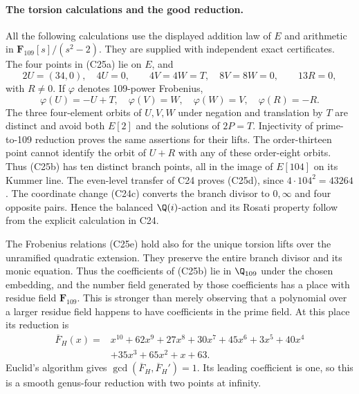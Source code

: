 \paragraph{The torsion calculations and the good reduction.}
All the following calculations use the displayed addition law
of $E$ and arithmetic in $\mathbf F_{109}[s]/(s^2-2)$.
They are supplied with independent exact certificates.
The four points in (C25a) lie on $E$, and
\[
 2U=(34,0),\quad4U=0,\qquad
 4V=4W=T,\quad8V=8W=0,\qquad13R=0,
\]
with $R\ne0$. If $\varphi$ denotes 109-power Frobenius,
\[
 \varphi(U)=-U+T,\quad
 \varphi(V)=W,\quad\varphi(W)=V,\quad
 \varphi(R)=-R.
 \tag{C25e}
\]
The three four-element orbits of $U,V,W$ under negation
and translation by $T$ are distinct and avoid both
$E[2]$ and the solutions of $2P=T$. Injectivity of
prime-to-109 reduction proves the same assertions for
their lifts. The order-thirteen point cannot identify
the orbit of $U+R$ with any of these order-eight orbits.
Thus (C25b) has ten distinct branch points, all in the
image of $E[104]$ on its Kummer line. The even-level
transfer of C24 proves (C25d), since $4\cdot104^2=43264$.
The coordinate change (C24c) converts the branch divisor
to $0,\infty$ and four opposite pairs. Hence the balanced
$\Q(i)$-action and its Rosati property follow from the
explicit calculation in C24.

The Frobenius relations (C25e) hold also for the unique
torsion lifts over the unramified quadratic extension.
They preserve the entire branch divisor and its monic
equation. Thus the coefficients of (C25b) lie in
$\Q_{109}$ under the chosen embedding, and the number
field generated by those coefficients has a place with
residue field $\mathbf F_{109}$. This is stronger than
merely observing that a polynomial over a larger residue
field happens to have coefficients in the prime field.
At this place its reduction is
\[
\begin{split}
 \overline F_H(x)={}&x^{10}+62x^9+27x^8+30x^7+45x^6
       +3x^5+40x^4\\
       &+35x^3+65x^2+x+63 .
\end{split}
 \tag{C25f}
\]
Euclid's algorithm gives
$\gcd(\overline F_H,\overline F_H')=1$.
Its leading coefficient is one, so this is a smooth
genus-four reduction with two points at infinity.

